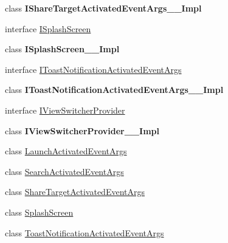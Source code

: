 \begin{DoxyCompactItemize}
\item 
class {\bfseries I\+Share\+Target\+Activated\+Event\+Args\+\_\+\+\_\+\+Impl}
\item 
interface \hyperlink{interface_windows_1_1_application_model_1_1_activation_1_1_i_splash_screen}{I\+Splash\+Screen}
\item 
class {\bfseries I\+Splash\+Screen\+\_\+\+\_\+\+Impl}
\item 
interface \hyperlink{interface_windows_1_1_application_model_1_1_activation_1_1_i_toast_notification_activated_event_args}{I\+Toast\+Notification\+Activated\+Event\+Args}
\item 
class {\bfseries I\+Toast\+Notification\+Activated\+Event\+Args\+\_\+\+\_\+\+Impl}
\item 
interface \hyperlink{interface_windows_1_1_application_model_1_1_activation_1_1_i_view_switcher_provider}{I\+View\+Switcher\+Provider}
\item 
class {\bfseries I\+View\+Switcher\+Provider\+\_\+\+\_\+\+Impl}
\item 
class \hyperlink{class_windows_1_1_application_model_1_1_activation_1_1_launch_activated_event_args}{Launch\+Activated\+Event\+Args}
\item 
class \hyperlink{class_windows_1_1_application_model_1_1_activation_1_1_search_activated_event_args}{Search\+Activated\+Event\+Args}
\item 
class \hyperlink{class_windows_1_1_application_model_1_1_activation_1_1_share_target_activated_event_args}{Share\+Target\+Activated\+Event\+Args}
\item 
class \hyperlink{class_windows_1_1_application_model_1_1_activation_1_1_splash_screen}{Splash\+Screen}
\item 
class \hyperlink{class_windows_1_1_application_model_1_1_activation_1_1_toast_notification_activated_event_args}{Toast\+Notification\+Activated\+Event\+Args}
\end{DoxyCompactItemize}
